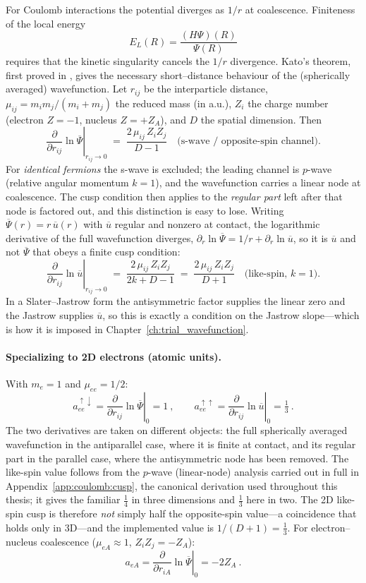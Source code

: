 For Coulomb interactions the potential diverges as $1/r$ at coalescence. Finiteness of the
local energy
\[
E_L(R)=\frac{(H\Psi)(R)}{\Psi(R)}
\]
requires that the kinetic singularity cancels the $1/r$ divergence. Kato’s theorem, first proved in \cite{Kato1957-EigenfunctionsManyParticle}, gives the
necessary short–distance behaviour of the (spherically averaged) wavefunction. Let $r_{ij}$ be the
interparticle distance, $\mu_{ij}=m_i m_j/(m_i+m_j)$ the reduced mass (in a.u.), $Z_i$ the charge
number (electron $Z=-1$, nucleus $Z=+Z_A$), and $D$ the spatial dimension. Then
\[
\left.\frac{\partial}{\partial r_{ij}}\ln \overline{\Psi}\right|_{r_{ij}\to 0}
\;=\; \frac{2\,\mu_{ij}\,Z_i Z_j}{D-1}
\quad\text{(s-wave / opposite-spin channel)}.
\]
For \emph{identical fermions} the s-wave is excluded; the leading channel is $p$-wave
(relative angular momentum $k=1$), and the wavefunction carries a linear node at
coalescence. The cusp condition then applies to the \emph{regular part} left after that node
is factored out, and this distinction is easy to lose. Writing
$\overline\Psi(r)=r\,\overline{u}(r)$ with $\overline u$ regular and nonzero at contact, the
logarithmic derivative of the full wavefunction diverges,
$\partial_r\ln\overline\Psi = 1/r + \partial_r\ln\overline u$, so it is $\overline u$ and not
$\overline\Psi$ that obeys a finite cusp condition:
\[
\left.\frac{\partial}{\partial r_{ij}}\ln \overline{u}\right|_{r_{ij}\to 0}
\;=\; \frac{2\,\mu_{ij}\,Z_i Z_j}{2k + D - 1}
\;=\; \frac{2\,\mu_{ij}\,Z_i Z_j}{D+1}
\quad\text{(like-spin, $k=1$)}.
\]
In a Slater--Jastrow form the antisymmetric factor supplies the linear zero and the Jastrow
supplies $\overline u$, so this is exactly a condition on the Jastrow slope---which is how it
is imposed in Chapter~\ref{ch:trial_wavefunction}.

\paragraph{Specializing to 2D electrons (atomic units).}
With $m_e=1$ and $\mu_{ee}=1/2$:
\[
\boxed{\ a_{ee}^{\uparrow\downarrow}=\left.\frac{\partial}{\partial r_{ij}}\ln \overline{\Psi}\right|_{0}=1\ ,\qquad
a_{ee}^{\uparrow\uparrow}=\left.\frac{\partial}{\partial r_{ij}}\ln \overline{u}\right|_{0}=\tfrac13\ .\ }
\]
The two derivatives are taken on different objects: the full spherically averaged
wavefunction in the antiparallel case, where it is finite at contact, and its regular part in
the parallel case, where the antisymmetric node has been removed.
The like-spin value follows from the $p$-wave (linear-node) analysis carried out in full
in Appendix~\ref{app:coulomb:cusp}, the canonical derivation used throughout this thesis;
it gives the familiar $\tfrac14$ in three dimensions and $\tfrac13$ here in two. The 2D
like-spin cusp is therefore \emph{not} simply half the opposite-spin value---a
coincidence that holds only in 3D---and the implemented value is $1/(D+1)=\tfrac13$.
For electron–nucleus coalescence ($\mu_{eA}\!\approx\!1$, $Z_i Z_j=-Z_A$):
\[
\boxed{\ a_{eA}=\left.\frac{\partial}{\partial r_{iA}}\ln \overline{\Psi}\right|_{0}=-2 Z_A\ .\ }
\]

